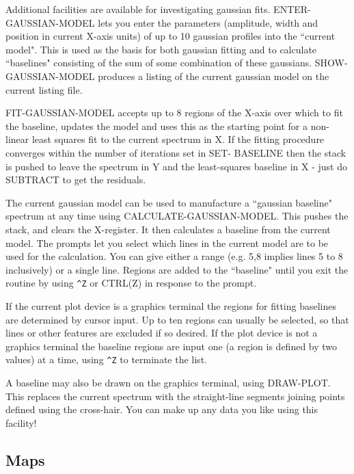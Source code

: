 \documentclass[11pt,twoside]{report}
\begin{document}
Additional facilities are available for investigating gaussian fits.
ENTER-GAUSSIAN-MODEL lets you enter the parameters (amplitude, width and
position in current X-axis units) of up to 10 gaussian profiles into the
``current model". This is used as the basis for both gaussian fitting and to
calculate ``baselines" consisting of the sum of some combination of these
gaussians. SHOW-GAUSSIAN-MODEL produces a listing of the current gaussian model
on the current listing file.

FIT-GAUSSIAN-MODEL 
accepts up to 8 regions of the X-axis over which to fit
the baseline, updates the model and uses this as the starting point for a
non-linear least squares fit to the current spectrum in X. If the fitting
procedure converges within the number of iterations set in SET- BASELINE then
the stack is pushed to leave the spectrum in Y and the least-squares baseline
in X - just do SUBTRACT to get the residuals.

The current gaussian model can be used to manufacture a ``gaussian baseline"
spectrum at any time using CALCULATE-GAUSSIAN-MODEL. This pushes the stack, and
clears the X-register. It then calculates a baseline from the current model.
The prompts let you select which lines in the current model are to be used for
the calculation. You can give either a range (e.g. 5,8 implies lines 5 to 8
inclusively) or a single line. Regions are added to the ``baseline" until you
exit the routine by using \verb+^Z+ or CTRL(Z)  in response to
the prompt.

If the current plot device is a graphics terminal the regions for fitting
baselines are determined by cursor  input.
Up to ten regions can usually be selected, so that lines or other features are
excluded if so desired. If the plot device is not a graphics terminal the
baseline regions are input one (a region is defined by two values) at a time,
using \verb+^Z+ to terminate the list.

A baseline may also be drawn on the graphics terminal, using DRAW-PLOT.
This replaces the current spectrum with the straight-line segments joining
points defined using the cross-hair. You can make up any data you like using
this facility!


\subsection{Maps} 
\end{document}
